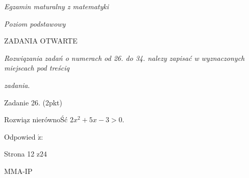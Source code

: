 \documentclass[a4paper,12pt]{article}
\begin{document}
{\it Egzamin maturalny z matematyki}

{\it Poziom podstawowy}

ZADANIA OTWARTE

{\it Rozwiqzania zadań o numerach od 26. do 34. nalezy zapisać w wyznaczonych miejscach pod treściq}

{\it zadania}.

Zadanie 26. (2pkt)

Rozwiąz nierównoŚć $2x^{2}+5x-3>0.$

Odpowied $\acute{\mathrm{z}}$:

Strona 12 $\mathrm{z}24$

MMA-IP
\end{document}
